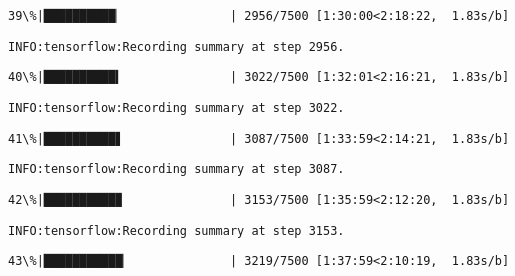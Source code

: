 \documentclass[11pt]{article}
\begin{document}
    \begin{Verbatim}[commandchars=\\\{\}]
 39\%|██████████▏               | 2956/7500 [1:30:00<2:18:22,  1.83s/b]
    \end{Verbatim}

    \begin{Verbatim}[commandchars=\\\{\}]
INFO:tensorflow:Recording summary at step 2956.

    \end{Verbatim}

    \begin{Verbatim}[commandchars=\\\{\}]
 40\%|██████████▍               | 3022/7500 [1:32:01<2:16:21,  1.83s/b]
    \end{Verbatim}

    \begin{Verbatim}[commandchars=\\\{\}]
INFO:tensorflow:Recording summary at step 3022.

    \end{Verbatim}

    \begin{Verbatim}[commandchars=\\\{\}]
 41\%|██████████▋               | 3087/7500 [1:33:59<2:14:21,  1.83s/b]
    \end{Verbatim}

    \begin{Verbatim}[commandchars=\\\{\}]
INFO:tensorflow:Recording summary at step 3087.

    \end{Verbatim}

    \begin{Verbatim}[commandchars=\\\{\}]
 42\%|██████████▉               | 3153/7500 [1:35:59<2:12:20,  1.83s/b]
    \end{Verbatim}

    \begin{Verbatim}[commandchars=\\\{\}]
INFO:tensorflow:Recording summary at step 3153.

    \end{Verbatim}

    \begin{Verbatim}[commandchars=\\\{\}]
 43\%|███████████▏              | 3219/7500 [1:37:59<2:10:19,  1.83s/b]
    \end{Verbatim}
\end{document}
